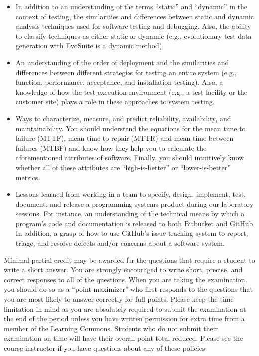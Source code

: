 \begin{itemize}
  \item In addition to an understanding of the terms ``static'' and ``dynamic'' in the context of testing, the
    similarities and differences between static and dynamic analysis techniques used for software testing and debugging.
    Also, the ability to classify techniques as either static or dynamic (e.g., evolutionary test data generation with
    EvoSuite is a dynamic method).

  \item An understanding of the order of deployment and the similarities and differences between different strategies
    for testing an entire system (e.g., function, performance, acceptance, and installation testing). Also, a knowledge
    of how the test execution environment (e.g., a test facility or the customer site) plays a role in these approaches
    to system testing.

  \item Ways to characterize, measure, and predict reliability, availability, and maintainability. You should understand
    the equations for the mean time to failure (MTTF), mean time to repair (MTTR) and mean time between failures (MTBF)
    and know how they help you to calculate the aforementioned attributes of software. Finally, you should intuitively
    know whether all of these attributes are ``high-is-better'' or ``lower-is-better'' metrics.

  \item Lessons learned from working in a team to specify, design, implement, test, document, and release a programming
    systems product during our laboratory sessions. For instance, an understanding of the technical means by which a
    program's code and documentation is released to both Bitbucket and GitHub. In addition, a grasp of how to use
    GitHub's issue tracking system to report, triage, and resolve defects and/or concerns about a software system.

\end{itemize}

\vspace*{-.05in}
\noindent Minimal partial credit may be awarded for the questions that require a student to write a short answer. You
are strongly encouraged to write short, precise, and correct responses to all of the questions. When you are taking the
examination, you should do so as a ``point maximizer'' who first responds to the questions that you are most likely to
answer correctly for full points. Please keep the time limitation in mind as you are absolutely required to submit the
examination at the end of the period unless you have written permission for extra time from a member of the
Learning Commons. Students who do not submit their examination on time will have their overall point total reduced.
Please see the course instructor if you have questions about any of these policies.

